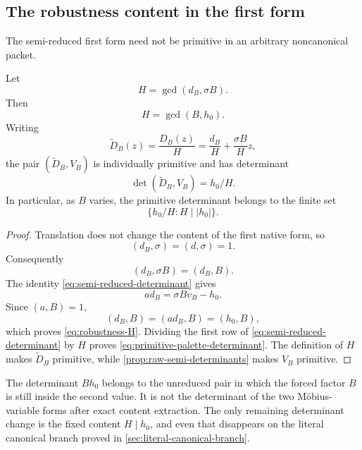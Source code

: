 \subsection{The robustness content in the first form}

The semi-reduced first form need not be primitive in an arbitrary
noncanonical packet.

\begin{theorem}
\label{thm:robustness-content}
Let
\begin{equation}
 H=\gcd(d_B,\sigma B).
\label{eq:robustness-H-definition}
\end{equation}
Then
\begin{equation}
 \boxed{H=\gcd(B,h_0).}
\label{eq:robustness-H}
\end{equation}
Writing
\[
 \widetilde D_B(z)
 =
 \frac{D_B(z)}H
 =
 \frac{d_B}H+\frac{\sigma B}H z,
\]
the pair \((\widetilde D_B,V_B)\) is individually primitive and has
determinant
\begin{equation}
 \boxed{\det(\widetilde D_B,V_B)=h_0/H.}
\label{eq:primitive-palette-determinant}
\end{equation}
In particular, as \(B\) varies, the primitive determinant belongs to
the finite set
\[
 \{h_0/H:H\mid |h_0|\}.
\]
\end{theorem}

\begin{proof}
Translation does not change the content of the first native form, so
\[
 (d_B,\sigma)=(d,\sigma)=1.
\]
Consequently
\[
 (d_B,\sigma B)=(d_B,B).
\]
The identity \eqref{eq:semi-reduced-determinant} gives
\[
 a d_B=\sigma Bv_B-h_0.
\]
Since \((a,B)=1\),
\[
 (d_B,B)=(ad_B,B)=(h_0,B),
\]
which proves \eqref{eq:robustness-H}.  Dividing the first row of
\eqref{eq:semi-reduced-determinant} by \(H\) proves
\eqref{eq:primitive-palette-determinant}.  The definition of \(H\)
makes \(\widetilde D_B\) primitive, while
\cref{prop:raw-semi-determinants} makes \(V_B\) primitive.
\end{proof}

\begin{remark}
\label{rem:representation-artifact}
The determinant \(Bh_0\) belongs to the unreduced pair in which the
forced factor \(B\) is still inside the second value.  It is not the
determinant of the two M\"obius-variable forms after exact content
extraction.  The only remaining determinant change is the fixed
content \(H\mid h_0\), and even that disappears on the literal
canonical branch proved in \cref{sec:literal-canonical-branch}.
\end{remark}


